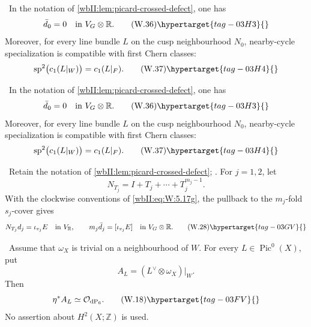 \begin{lemma}
\hypertarget{tag-03ID}{}\label{wbII:lem:picard-cusp-defect}


\ In the notation of
\cref{wbII:lem:picard-crossed-defect}, one has
\[
 \bar d_0=0\quad\text{in }V_G\otimes\mathbb R.
\tag{W.36}\hypertarget{tag-03H3}{}\label{wbII:eq:W:5.17n}
\]
Moreover, for every line bundle $L$ on the cusp neighbourhood $N_0$,
nearby-cycle specialization is compatible with first Chern classes:
\[
 \operatorname{sp}^2\bigl(c_1(L|_W)\bigr)=c_1(L|_F).
\tag{W.37}\hypertarget{tag-03H4}{}\label{wbII:eq:W:5.17o}
\]
\end{lemma}

\begin{lemma}
\hypertarget{tag-03ID}{}\label{wbII:lem:picard-cusp-defect}


\ In the notation of
\cref{wbII:lem:picard-crossed-defect}, one has
\[
 \bar d_0=0\quad\text{in }V_G\otimes\mathbb R.
\tag{W.36}\hypertarget{tag-03H3}{}\label{wbII:eq:W:5.17n}
\]
Moreover, for every line bundle $L$ on the cusp neighbourhood $N_0$,
nearby-cycle specialization is compatible with first Chern classes:
\[
 \operatorname{sp}^2\bigl(c_1(L|_W)\bigr)=c_1(L|_F).
\tag{W.37}\hypertarget{tag-03H4}{}\label{wbII:eq:W:5.17o}
\]
\end{lemma}

\begin{lemma}
\hypertarget{tag-03IE}{}\label{wbII:lem:picard-finite-norm}


\ Retain the notation of
\cref{wbII:lem:picard-crossed-defect}; .  For
$j=1,2$, let
\[
 N_{T_j}=I+T_j+\cdots+T_j^{m_j-1}.
\]
With the clockwise conventions of \eqref{wbII:eq:W:5.17g}, the pullback to the
$m_j$-fold $s_j$-cover gives
\[
 N_{T_j}d_j=\iota_{v_j}E
 \quad\text{in }V_{\mathbb R},
\qquad
 m_j\bar d_j=[\iota_{v_j}E]
 \quad\text{in }V_G\otimes\mathbb R.
\tag{W.28}\hypertarget{tag-03GV}{}\label{wbII:eq:W:5.17k}
\]
\end{lemma}

\begin{proposition}
\hypertarget{tag-03IO}{}\label{wbII:prop:pic0-pullback}


\ Assume that $\omega_X$ is trivial on a neighbourhood of $W$.
For every $L\in\operatorname{Pic}^0(X)$, put
\[
 A_L=(L^\vee\otimes\omega_X)|_W.
\]
Then
\[
 \eta^*A_L\simeq\mathcal O_{\mathrm{dP}_6}.
\tag{W.18}\hypertarget{tag-03FV}{}\label{wbII:eq:W:5.17a}
\]
No assertion about $H^2(X;\mathbb Z)$ is used.
\end{proposition}

